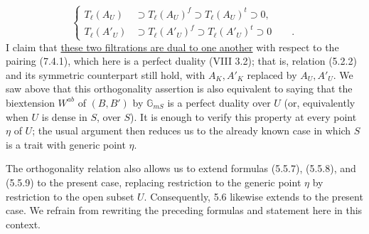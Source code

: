 \begin{equation}\tag{7.4.9}
\left\{
\begin{aligned}
T_\ell(A_U)&\supset T_\ell(A_U)^f\supset T_\ell(A_U)^t\supset0,\\[4ex]
T_\ell(A'_U)&\supset T_\ell(A'_U)^f\supset T_\ell(A'_U)^t\supset0
\qquad .
\end{aligned}
\right.
\end{equation}
I claim that \underline{these two filtrations are dual to one another}
with respect to the pairing (7.4.1), which here is a perfect duality
(VIII 3.2); that is, relation (5.2.2) and its symmetric counterpart
still hold, with $A_K,A'_K$ replaced by $A_U,A'_U$. We saw above that
this orthogonality assertion is also equivalent to saying that the
biextension $W^{ab}$ of $(B,B')$ by $\mathbb G_{mS}$ is a perfect
duality over $U$ (or, equivalently when $U$ is dense in $S$, over
$S$). It is enough to verify this property at every point $\eta$ of
$U$; the usual argument then reduces us to the already known case in
which $S$ is a trait with generic point $\eta$.

The orthogonality relation also allows us to extend formulas (5.5.7),
(5.5.8), and (5.5.9) to the present case, replacing restriction to the
generic point $\eta$ by restriction to the open subset $U$.
Consequently, 5.6 likewise extends to the present case. We refrain
from rewriting the preceding formulas and statement here in this
context.

